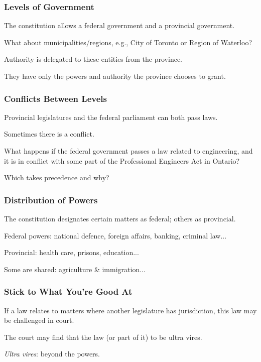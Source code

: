 \begin{frame}
\frametitle{Levels of Government}

The constitution allows a federal government and a provincial government.

What about municipalities/regions, e.g., City of Toronto or Region of Waterloo?

Authority is delegated to these entities from the province. 

They have only the powers and authority the province chooses to grant.

\end{frame}



\begin{frame}
\frametitle{Conflicts Between Levels}

Provincial legislatures and the federal parliament can both pass laws.

Sometimes there is a conflict.

What happens if the federal government passes a law related to engineering, and it is in conflict with some part of the Professional Engineers Act in Ontario?

Which takes precedence and why?

\end{frame}



\begin{frame}
\frametitle{Distribution of Powers}

The constitution designates certain matters as federal; others as provincial. 

Federal powers: national defence, foreign affairs, banking, criminal law...

Provincial: health care, prisons, education...

Some are shared: agriculture \& immigration...

\end{frame}



\begin{frame}
\frametitle{Stick to What You're Good At}
If a law relates to matters where another legislature has jurisdiction, this law may be challenged in court.

The court may find that the law (or part of it) to be \alert{ultra vires}.

\textit{Ultra vires}: beyond the powers.

\end{frame}




